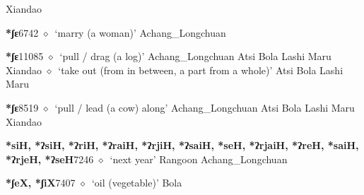 \begin{list}{}{\leftmargin=1.5em \itemindent=-1.5em}
\hspace{1ex}
         Xiandao 
  \item {\footnotesize \textbf{*ʃɛ}}{\tiny 6742}
\hspace{1ex}
         $\diamond$~`marry (a woman)'
         Achang\_Longchuan 
  \item {\footnotesize \textbf{*ʃɛ}}{\tiny 11085}
\hspace{1ex}
         $\diamond$~`pull / drag (a log)'
         Achang\_Longchuan 
\hspace{1ex}
         Atsi 
\hspace{1ex}
         Bola 
\hspace{1ex}
         Lashi 
\hspace{1ex}
         Maru 
\hspace{1ex}
         Xiandao 
\hspace{1ex}
         $\diamond$~`take out (from in between, a part from a whole)'
         Atsi 
\hspace{1ex}
         Bola 
\hspace{1ex}
         Lashi 
\hspace{1ex}
         Maru 
  \item {\footnotesize \textbf{*ʃɛ}}{\tiny 8519}
\hspace{1ex}
         $\diamond$~`pull / lead (a cow) along'
         Achang\_Longchuan 
\hspace{1ex}
         Atsi 
\hspace{1ex}
         Bola 
\hspace{1ex}
         Lashi 
\hspace{1ex}
         Maru 
\hspace{1ex}
         Xiandao 
  \item {\footnotesize \textbf{*siH, *ʔsiH, *ʔriH, *ʔraiH, *ʔrjiH, *ʔsaiH, *seH, *ʔrjaiH, *ʔreH, *saiH, *ʔrjeH, *ʔseH}}{\tiny 7246}
\hspace{1ex}
         $\diamond$~`next year'
         Rangoon 
\hspace{1ex}
         Achang\_Longchuan 
  \item {\footnotesize \textbf{*ʃeX, *ʃiX}}{\tiny 7407}
\hspace{1ex}
         $\diamond$~`oil (vegetable)'
         Bola 
  \end{list}
